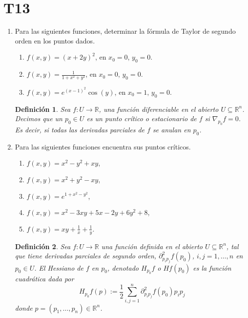 \documentclass{article}
\newtheorem{definicion}{Definici\'on}
\theoremstyle{definition}
\begin{document}
  \section*{T13 }
  \begin{enumerate}
  \item Para las siguientes funciones, determinar la f\'ormula
    de Taylor de segundo orden en los puntos dados.
    \begin{enumerate}
    \item $f(x,y)=(x+2y)^2$, en $x_0=0$, $y_0=0$.
    \item $f(x,y)=\frac{1}{1+x^2+y^2}$, en $x_0=0$, $y_0=0$.
    \item $f(x,y)=e^{(x-1)^2}\cos(y)$, en  $x_0=1$, $y_0=0$.
    \end{enumerate}

    \begin{definicion}
      Sea $f:U  \to \mathbb{R}$,
      una funci\'on diferenciable en el abierto $U\subseteq \mathbb{R}^n$.
      Decimos
      que un $p_0\in U$ es un punto cr\'itico
      o estacionario de $f$ si $\nabla_{p_0}f=0$. Es decir, si todas
      las derivadas parciales de $f$ se anulan en $p_0$.
    \end{definicion}
    
    
  \item\label{Ejer:PtsCriticos}
    Para las siguientes funciones  encuentra sus puntos cr\'iticos.
  
 
    \begin{enumerate}
    \item $f(x,y)=x^2-y^2+xy$,
    \item $f(x,y)=x^2+y^2-xy$,
    \item $f(x,y)=e^{1+x^2-y^2}$,
    \item $f(x,y)=x^2-3xy+5x-2y+6y^2+8$,
    \item $f(x,y)=xy+\frac{1}{x}+\frac{1}{y}$.
    \end{enumerate}
    

    \begin{definicion}
      Sea $f:U \to \mathbb{R}$ una funci\'on definida en el
      abierto $U\subseteq \mathbb{R}^n$, tal que tiene derivadas
      parciales de segundo orden, $\partial^2_{p_i p_j}f(p_0)$, $i,j=1,\dots, n$
      en  $p_0\in U$. El Hessiano de $f$ en $p_0$, denotado $H_{p_0}f$
      o $Hf(p_0)$ es la funci\'on cuadr\'atica dada por
      $$
      H_{p_0}f(p):=\frac{1}{2}\sum_{i,j=1}^n
      \partial^2_{p_i p_j}f(p_0)p_ip_j
      $$
      donde $p=(p_1,\dots, p_n)\in \mathbb{R}^n$.
      \end{definicion}
    

\end{enumerate}
\end{document}
